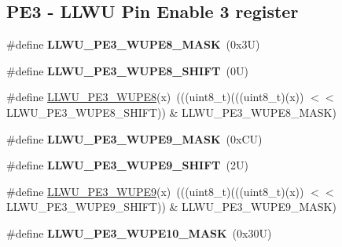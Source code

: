 \subsection*{P\+E3 -\/ L\+L\+WU Pin Enable 3 register}
\begin{DoxyCompactItemize}
\item 
\mbox{\label{group___l_l_w_u___register___masks_gabe7fce492e2c0201c4bb5af893f5a63d}} 
\#define {\bfseries L\+L\+W\+U\+\_\+\+P\+E3\+\_\+\+W\+U\+P\+E8\+\_\+\+M\+A\+SK}~(0x3\+U)
\item 
\mbox{\label{group___l_l_w_u___register___masks_gaf02591badd7f37915120d0fd627cdf27}} 
\#define {\bfseries L\+L\+W\+U\+\_\+\+P\+E3\+\_\+\+W\+U\+P\+E8\+\_\+\+S\+H\+I\+FT}~(0\+U)
\item 
\#define \mbox{\hyperlink{group___l_l_w_u___register___masks_gad6e40b93385848a0a6dc1177f884107a}{L\+L\+W\+U\+\_\+\+P\+E3\+\_\+\+W\+U\+P\+E8}}(x)~(((uint8\+\_\+t)(((uint8\+\_\+t)(x)) $<$$<$ L\+L\+W\+U\+\_\+\+P\+E3\+\_\+\+W\+U\+P\+E8\+\_\+\+S\+H\+I\+FT)) \& L\+L\+W\+U\+\_\+\+P\+E3\+\_\+\+W\+U\+P\+E8\+\_\+\+M\+A\+SK)
\item 
\mbox{\label{group___l_l_w_u___register___masks_gad03733955d18194da002aeceedc2edf5}} 
\#define {\bfseries L\+L\+W\+U\+\_\+\+P\+E3\+\_\+\+W\+U\+P\+E9\+\_\+\+M\+A\+SK}~(0x\+C\+U)
\item 
\mbox{\label{group___l_l_w_u___register___masks_ga26cad28b7fe4fd2da53ece9d3744016c}} 
\#define {\bfseries L\+L\+W\+U\+\_\+\+P\+E3\+\_\+\+W\+U\+P\+E9\+\_\+\+S\+H\+I\+FT}~(2\+U)
\item 
\#define \mbox{\hyperlink{group___l_l_w_u___register___masks_ga644ab845edd61fbd851fca7254c6a3f0}{L\+L\+W\+U\+\_\+\+P\+E3\+\_\+\+W\+U\+P\+E9}}(x)~(((uint8\+\_\+t)(((uint8\+\_\+t)(x)) $<$$<$ L\+L\+W\+U\+\_\+\+P\+E3\+\_\+\+W\+U\+P\+E9\+\_\+\+S\+H\+I\+FT)) \& L\+L\+W\+U\+\_\+\+P\+E3\+\_\+\+W\+U\+P\+E9\+\_\+\+M\+A\+SK)
\item 
\mbox{\label{group___l_l_w_u___register___masks_ga6d8e812233df26a72459712117996efa}} 
\#define {\bfseries L\+L\+W\+U\+\_\+\+P\+E3\+\_\+\+W\+U\+P\+E10\+\_\+\+M\+A\+SK}~(0x30\+U)
\item 
\mbox{\label{group___l_l_w_u___register___masks_ga1686c8515045158eeef3fc0c5df480d9}} 

\end{DoxyCompactItemize}
